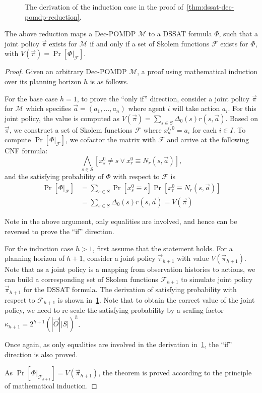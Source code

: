 \begin{figure}[t]
    \centering
    
    \caption{The derivation of the induction case in the proof of~\cref{thm:dssat-dec-pomdp-reduction}.}
    \label{fig:dssat-dec-pomdp-derivation}
\end{figure}

\begin{theorem}\label{thm:dssat-dec-pomdp-reduction}
    The above reduction maps a Dec-POMDP $\mathcal{M}$ to a DSSAT formula $\Phi$, such that a joint policy $\vec{\pi}$ exists for $\mathcal{M}$ if and only if a set of Skolem functions $\mathcal{F}$ exists for $\Phi$, with $V(\vec{\pi})=\Pr[\Phi|_{\mathcal{F}}]$.
\end{theorem}
\begin{proof}
    Given an arbitrary Dec-POMDP $\mathcal{M}$, a proof using mathematical induction over its planning horizon $h$ is as follows.

    For the base case $h=1$, to prove the ``only if'' direction, consider a joint policy $\vec{\pi}$ for $\mathcal{M}$ which specifies $\vec{a}=(a_1,\ldots,a_n)$ where agent $i$ will take action $a_i$. For this joint policy, the value is computed as $V(\vec{\pi})=\sum_{s \in S}\Delta_0(s)r(s,\vec{a})$. Based on $\vec{\pi}$, we construct a set of Skolem functions $\mathcal{F}$ where $x_a^{i,0}=a_i$ for each $i\in I$. To compute $\Pr[\Phi|_{\mathcal{F}}]$, we cofactor the matrix with $\mathcal{F}$ and arrive at the following CNF formula:
    \[
        \bigwedge_{s\in S}[x_s^0\neq s \vee x_r^0 \equiv N_r(s,\vec{a})],
    \]
    and the satisfying probability of $\Phi$ with respect to $\mathcal{F}$ is
    \begin{align*}
        \Pr[\Phi|_{\mathcal{F}}] & =\sum_{s\in S}\Pr[x_s^0 \equiv s]\Pr[x_r^0 \equiv N_r(s,\vec{a})] \\
                                 & =\sum_{s\in S}\Delta_0(s)r(s,\vec{a})=V(\vec{\pi})
    \end{align*}

    Note in the above argument, only equalities are involved, and hence can be reversed to prove the ``if'' direction.

    For the induction case $h>1$, first assume that the statement holds. For a planning horizon of $h+1$, consider a joint policy $\vec{\pi}_{h+1}$ with value $V(\vec{\pi}_{h+1})$. Note that as a joint policy is a mapping from observation histories to actions, we can build a corresponding set of Skolem functions $\mathcal{F}_{h+1}$ to simulate joint policy $\vec{\pi}_{h+1}$ for the DSSAT formula. The derivation of satisfying probability with respect to $\mathcal{F}_{h+1}$ is shown in~\cref{fig:dssat-dec-pomdp-derivation}. Note that to obtain the correct value of the joint policy, we need to re-scale the satisfying probability by a scaling factor $\kappa_{h+1}=2^{h+1}(|\vec{O}||S|)^{h}$.

    Once again, as only equalities are involved in the derivation in~\cref{fig:dssat-dec-pomdp-derivation}, the ``if'' direction is also proved.

    As $\Pr[\Phi|_{\mathcal{F}_{h+1}}]=V(\vec{\pi}_{h+1})$, the theorem is proved according to the principle of mathematical induction.
\end{proof}
